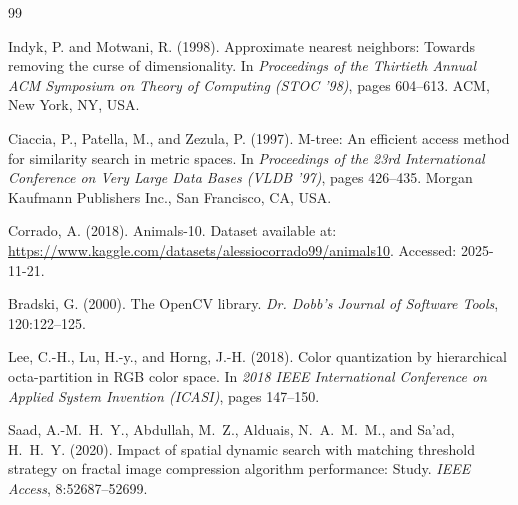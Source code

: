 \documentclass{sbc2023}
\begin{document}
\begin{thebibliography}{99}

Indyk, P. and Motwani, R. (1998).
Approximate nearest neighbors: Towards removing the curse of dimensionality.
In \textit{Proceedings of the Thirtieth Annual ACM Symposium on Theory of Computing (STOC '98)}, pages 604--613. ACM, New York, NY, USA.

Ciaccia, P., Patella, M., and Zezula, P. (1997).
M-tree: An efficient access method for similarity search in metric spaces.
In \textit{Proceedings of the 23rd International Conference on Very Large Data Bases (VLDB '97)}, pages 426--435. Morgan Kaufmann Publishers Inc., San Francisco, CA, USA.

Corrado, A. (2018).
Animals-10.
Dataset available at: \url{https://www.kaggle.com/datasets/alessiocorrado99/animals10}. Accessed: 2025-11-21.

Bradski, G. (2000).
The OpenCV library.
\textit{Dr. Dobb's Journal of Software Tools}, 120:122--125.

Lee, C.-H., Lu, H.-y., and Horng, J.-H. (2018).
Color quantization by hierarchical octa-partition in RGB color space.
In \textit{2018 IEEE International Conference on Applied System Invention (ICASI)}, pages 147--150.

Saad, A.-M.~H.~Y., Abdullah, M.~Z., Alduais, N.~A.~M.~M., and Sa'ad, H.~H.~Y. (2020).
Impact of spatial dynamic search with matching threshold strategy on fractal image compression algorithm performance: Study.
\textit{IEEE Access}, 8:52687--52699.

\end{thebibliography}
\end{document}
